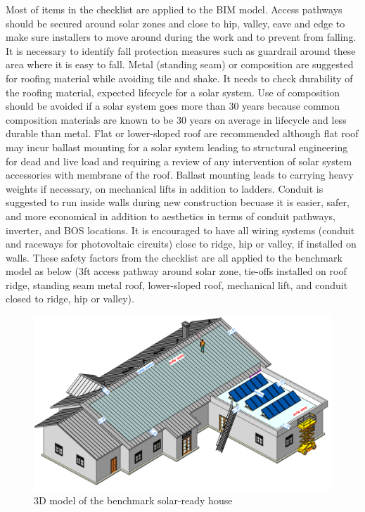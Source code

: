 \documentclass[]{article}
\begin{document}
Most of items in the checklist are applied to the BIM model. Access
pathways should be secured around solar zones and close to hip, valley,
eave and edge to make sure installers to move around during the work and
to prevent from falling. It is necessary to identify fall protection
measures such as guardrail around these area where it is easy to fall.
Metal (standing seam) or composition are suggested for roofing material
while avoiding tile and shake. It needs to check durability of the
roofing material, expected lifecycle for a solar system. Use of
composition should be avoided if a solar system goes more than 30 years
because common composition materials are known to be 30 years on average
in lifecycle and less durable than metal. Flat or lower-sloped roof are
recommended although flat roof may incur ballast mounting for a solar
system leading to structural engineering for dead and live load and
requiring a review of any intervention of solar system accessories with
membrane of the roof. Ballast mounting leads to carrying heavy weights
if necessary, on mechanical lifts in addition to ladders. Conduit is
suggested to run inside walls during new construction becuase it is
easier, safer, and more economical in addition to aesthetics in terms of
conduit pathways, inverter, and BOS locations. It is encouraged to have
all wiring systems (conduit and raceways for photovoltaic circuits)
close to ridge, hip or valley, if installed on walls. These safety
factors from the checklist are all applied to the benchmark model as
below (3ft access pathway around solar zone, tie-offs installed on roof
ridge, standing seam metal roof, lower-sloped roof, mechanical lift, and
conduit closed to ridge, hip or valley).

\begin{figure}
\centering
\includegraphics{3d_3.png}
\caption{3D model of the benchmark solar-ready house}
\end{figure}
\end{document}
